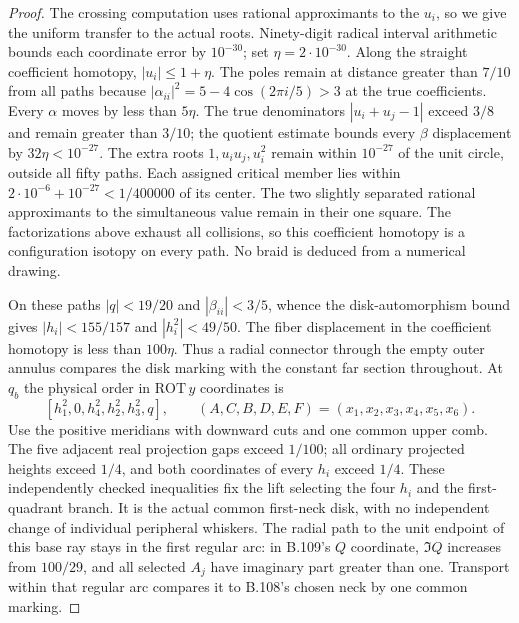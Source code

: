 \begin{proof}
The crossing computation uses rational approximants to the $u_i$,
so we give the uniform transfer to the actual roots. Ninety-digit
radical interval arithmetic bounds each coordinate error by
$10^{-30}$; set $\eta=2\cdot10^{-30}$. Along the straight
coefficient homotopy, $|u_i|\leq1+\eta$. The poles remain at
distance greater than $7/10$ from all paths because
$|\alpha_{ii}|^2=5-4\cos(2\pi i/5)>3$ at the true coefficients.
Every $\alpha$ moves by less than $5\eta$. The true denominators
$|u_i+u_j-1|$ exceed $3/8$ and remain greater than $3/10$;
the quotient estimate bounds every $\beta$ displacement by
$32\eta<10^{-27}$. The extra roots $1,u_iu_j,u_i^2$ remain
within $10^{-27}$ of the unit circle, outside all fifty paths.
Each assigned critical member lies within
$2\cdot10^{-6}+10^{-27}<1/400000$ of its center. The two
slightly separated rational approximants to the simultaneous value
remain in their one square. The factorizations above exhaust all
collisions, so this coefficient homotopy is a configuration isotopy
on every path. No braid is deduced from a numerical drawing.

On these paths $|q|<19/20$ and $|\beta_{ii}|<3/5$, whence the
disk-automorphism bound gives $|h_i|<155/157$ and $|h_i^2|<49/50$.
The fiber displacement in the coefficient homotopy is less than
$100\eta$. Thus a radial connector through the empty outer annulus
compares the disk marking with the constant far section throughout.
At $q_b$ the physical order in $\mathrm{ROT}\,y$ coordinates is
\[
 [h_1^2,0,h_4^2,h_2^2,h_3^2,q],
 \qquad (A,C,B,D,E,F)=(x_1,x_2,x_3,x_4,x_5,x_6).
\]
Use the positive meridians with downward cuts and one common upper
comb. The five adjacent real projection gaps exceed $1/100$;
all ordinary projected heights exceed $1/4$, and both coordinates
of every $h_i$ exceed $1/4$. These independently checked inequalities
fix the lift selecting the four $h_i$ and the first-quadrant branch.
It is the actual common first-neck disk, with no independent change
of individual peripheral whiskers. The radial path to the unit
endpoint of this base ray stays in the first regular arc: in B.109's
$Q$ coordinate, $\Im Q$ increases from $100/29$, and all selected
$A_j$ have imaginary part greater than one. Transport within that
regular arc compares it to B.108's chosen neck by one common marking.


\end{proof}
